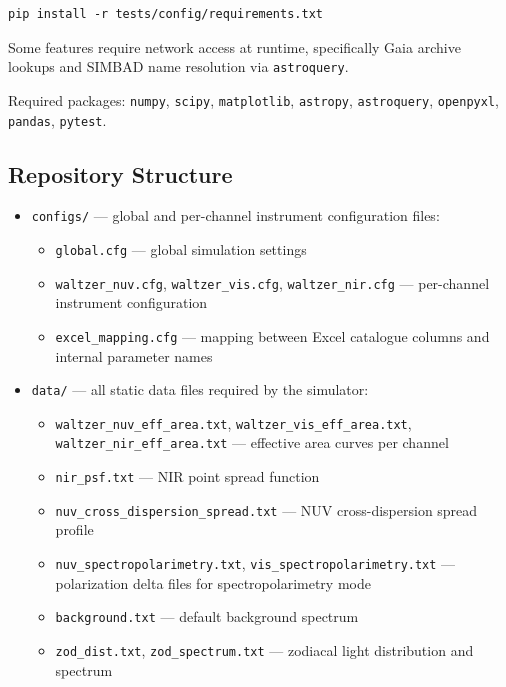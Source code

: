\begin{verbatim}
pip install -r tests/config/requirements.txt
\end{verbatim}

Some features require network access at runtime, specifically Gaia archive lookups and SIMBAD name resolution via \texttt{astroquery}.

Required packages: \texttt{numpy}, \texttt{scipy}, \texttt{matplotlib}, \texttt{astropy}, \texttt{astroquery}, \texttt{openpyxl}, \texttt{pandas}, \texttt{pytest}.

\subsection{Repository Structure}

\begin{itemize}
    \item \texttt{configs/} — global and per-channel instrument configuration files:
          \begin{itemize}
              \item \texttt{global.cfg} — global simulation settings
              \item \texttt{waltzer\_nuv.cfg}, \texttt{waltzer\_vis.cfg}, \texttt{waltzer\_nir.cfg} — per-channel instrument configuration
              \item \texttt{excel\_mapping.cfg} — mapping between Excel catalogue columns and internal parameter names
          \end{itemize}
    \item \texttt{data/} — all static data files required by the simulator:
          \begin{itemize}
              \item \texttt{waltzer\_nuv\_eff\_area.txt}, \texttt{waltzer\_vis\_eff\_area.txt}, \texttt{waltzer\_nir\_eff\_area.txt} — effective area curves per channel
              \item \texttt{nir\_psf.txt} — NIR point spread function
              \item \texttt{nuv\_cross\_dispersion\_spread.txt} — NUV cross-dispersion spread profile
              \item \texttt{nuv\_spectropolarimetry.txt}, \texttt{vis\_spectropolarimetry.txt} — polarization delta files for spectropolarimetry mode
              \item \texttt{background.txt} — default background spectrum
              \item \texttt{zod\_dist.txt}, \texttt{zod\_spectrum.txt} — zodiacal light distribution and spectrum

\end{itemize}
\end{itemize}
